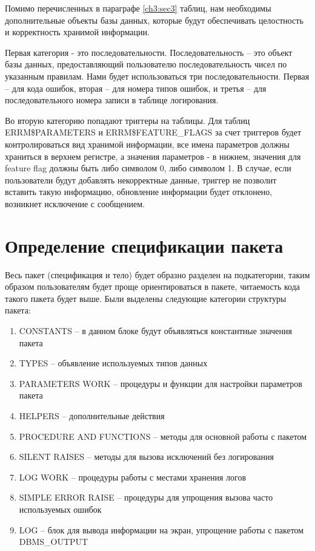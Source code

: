 Помимо перечисленных в параграфе \ref{ch3:sec3} таблиц, нам необходимы дополнительные объекты базы данных, которые будут обеспечивать целостность и корректность хранимой информации.

Первая категория - это последовательности. Последовательность – это объект базы данных, предоставляющий пользователю последовательность чисел по указанным правилам. Нами будет использоваться три последовательности. Первая – для кода ошибок, вторая – для номера типов ошибок, и третья – для последовательного номера записи в таблице логирования.  

Во вторую категорию попадают триггеры на таблицы. Для таблиц ERRM\$PARAMETERS и ERRM\$FEATURE\_FLAGS за счет триггеров будет контролироваться вид хранимой информации, все имена параметров должны храниться в верхнем регистре, а значения параметров - в нижнем, значения для feature flag должны быть либо символом 0, либо символом 1. В случае, если пользователи будут добавлять некорректные данные, триггер не позволит вставить такую информацию, обновление информации будет отклонено, возникнет исключение с сообщением. 


\section{Определение спецификации пакета} \label{ch3:sec5}
 
Весь пакет (спецификация и тело) будет образно разделен на подкатегории, таким образом пользователям будет проще ориентироваться в пакете, читаемость кода такого пакета будет выше. Были выделены следующие категории структуры пакета: 

\begin{enumerate} 
\item CONSTANTS – в данном блоке будут объявляться константные значения пакета
\item TYPES – объявление используемых типов данных
\item PARAMETERS WORK – процедуры и функции для настройки параметров пакета
\item HELPERS – дополнительные действия 
\item PROCEDURE AND FUNCTIONS – методы для основной работы с пакетом
\item SILENT RAISES – методы для вызова исключений без логирования
\item LOG WORK – процедуры работы с местами хранения логов
\item SIMPLE ERROR RAISE – процедуры для упрощения вызова часто используемых ошибок
\item LOG – блок для вывода информации на экран, упрощение работы с пакетом DBMS\_OUTPUT
\end{enumerate} 

